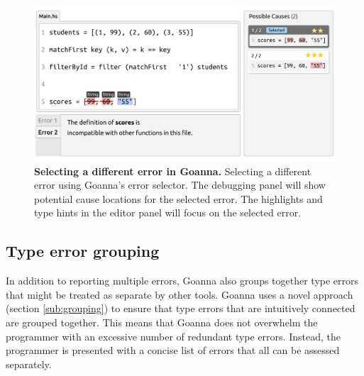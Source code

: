 \documentclass[pdflatex,sn-nature,Numbered]{sn-jnl}%
\begin{document}
    \begin{figure}[ht!]
        \centering
        \includegraphics[width=\linewidth]{images/goanna-multi-error}
        \caption[Selecting a different error in Goanna]{\textbf{Selecting a different error in Goanna.} Selecting a different error using Goanna's error selector. The debugging panel will show potential cause locations for the selected error. The highlights and type hints in the editor panel will focus on the selected error.}
        \label{fig:multi-error}
    \end{figure}



    \subsection{Type error grouping}  \label{sub:group}
    In addition to reporting multiple errors, Goanna also groups together type errors that might be treated as separate by other tools. Goanna uses a novel approach (section \ref{sub:grouping}) to ensure that type errors that are intuitively connected are grouped together. This means that Goanna does not overwhelm the programmer with an excessive number of redundant type errors. Instead, the programmer is presented with a concise list of errors that all can be assessed separately.
\end{document}
